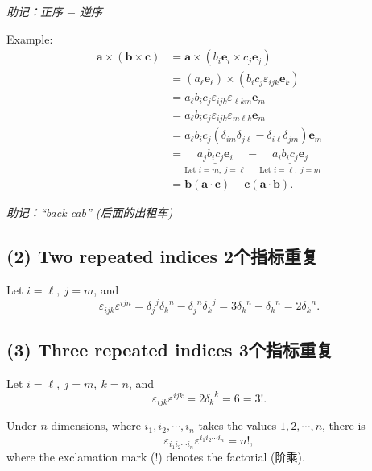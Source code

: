 \emph{助记：正序 \(-\) 逆序}

Example: \begin{align*}
    \boldsymbol a \times \left(\boldsymbol b \times \boldsymbol c\right)
    & = \boldsymbol a \times \left(b_i\boldsymbol e_i \times c_j \boldsymbol e_j \right) \\
    & = \left(a_\ell \boldsymbol e_\ell \right) \times \left(b_i c_j \varepsilon_{ijk} \boldsymbol e_k \right) \\
    & = a_\ell b_i c_j \varepsilon_{ijk} \varepsilon_{\ell km} \boldsymbol e_m \\
    & = a_\ell b_i c_j \varepsilon_{ijk} \varepsilon_{m \ell k} \boldsymbol e_m \\
    & = a_\ell b_i c_j \left( \delta_{im}\delta_{j \ell} - \delta_{i \ell}\delta_{jm} \right) \boldsymbol e_m \\
    & = \underset{\text{Let } i = m,\ j = \ell}{\underline{a_j b_i c_j \boldsymbol e_i}} - \underset{\text{Let } i = \ell,\ j = m}{\underline{a_i b_i c_j \boldsymbol e_j}} \\
    & = \boldsymbol b  \left(\boldsymbol a \cdot \boldsymbol c \right) - \boldsymbol c \left(\boldsymbol a \cdot \boldsymbol b \right).
\end{align*}

\emph{助记：``back cab'' (后面的出租车)}

\subsection*{(2) Two repeated indices
2个指标重复}\label{two-repeated-indices-2ux4e2aux6307ux6807ux91cdux590d}

Let \(i=\ell, \ j = m\), and
\[\varepsilon_{ijk}\varepsilon^{ijn} = {\delta_j}^j {\delta_k}^n - {\delta_j}^n {\delta_k}^j = 3 {\delta_k}^n - {\delta_k}^n = 2 {\delta_k}^n.\]

\subsection*{(3) Three repeated indices
3个指标重复}\label{three-repeated-indices-3ux4e2aux6307ux6807ux91cdux590d}

Let \(i=\ell, \ j = m, \ k = n\), and
\[\varepsilon_{ijk}\varepsilon^{ijk} = 2 {\delta_k}^k = 6 = 3!.\]

Under \(n\) dimensions, where \(i_1, i_2, \cdots, i_n\) takes the values
\(1, 2, \cdots, n\), there is
\[\varepsilon_{i_1 i_2 \cdots i_n}\varepsilon^{i_1 i_2 \cdots i_n} = n!,\]
where the exclamation mark (\(!\)) denotes the factorial (阶乘).

